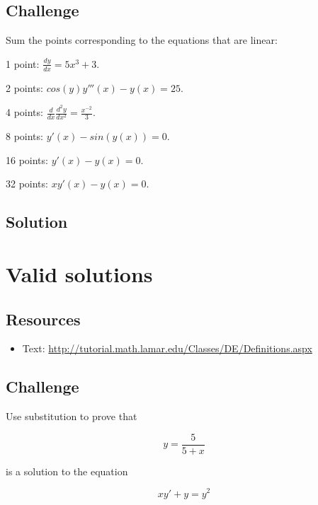 \subsection*{Challenge}
Sum the points corresponding to the equations that are linear:

1 point: $\frac{dy}{dx} = 5x^3 + 3$.

2 points: $cos(y) y'''(x) - y(x) = 25$.

4 points: $\frac{d}{dx} \frac{d^2 y}{dx^2} = \frac{x^{-2}}{3}$.

8 points: $y'(x) - sin(y(x)) = 0$.

16 points: $y'(x) - y(x) = 0$.

32 points: $x y'(x) - y(x) = 0$.

\subsection*{Solution}
\six{}




\newpage

\section{Valid solutions}

\subsection*{Resources}
\begin{itemize}
    \item Text: \url{http://tutorial.math.lamar.edu/Classes/DE/Definitions.aspx}
\end{itemize}

\subsection*{Challenge}

Use substitution to prove that

\begin{equation}
    y=\frac{5}{5+x}
\end{equation}

is a solution to the equation

\begin{equation}
    x y'+y=y^2
\end{equation}

